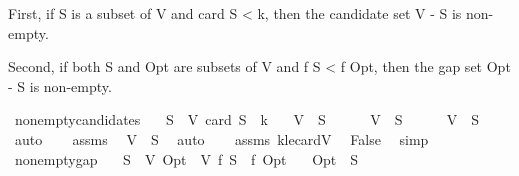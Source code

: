\begin{isabellebody}
\begin{isamarkuptext}
  First, if S is a subset of V and card S < k, then the candidate set V - S
  is non-empty.

  Second, if both S and Opt are subsets of V and f S < f Opt, then the gap
  set Opt - S is non-empty.%
\end{isamarkuptext}\isamarkuptrue%
\isamarkupfalse%
\ nonempty{\isacharunderscore}{\kern0pt}candidates{\isacharcolon}{\kern0pt}\isanewline
\ \ \ {\isachardoublequoteopen}S\ {\isasymsubseteq}\ V{\isachardoublequoteclose}\ {\isachardoublequoteopen}card\ S\ {\isacharless}{\kern0pt}\ k{\isachardoublequoteclose}\isanewline
\ \ \ {\isachardoublequoteopen}V\ {\isacharminus}{\kern0pt}\ S\ {\isasymnoteq}\ {\isacharbraceleft}{\kern0pt}{\isacharbraceright}{\kern0pt}{\isachardoublequoteclose}\isanewline
%
\isadelimproof
%
\endisadelimproof
%
\isatagproof
{}\isamarkupfalse%
\isanewline
\ \ \isamarkupfalse%
\ {\isachardoublequoteopen}V\ {\isacharminus}{\kern0pt}\ S\ {\isacharequal}{\kern0pt}\ {\isacharbraceleft}{\kern0pt}{\isacharbraceright}{\kern0pt}{\isachardoublequoteclose}\isanewline
\ \ \isamarkupfalse%
\ {\isachardoublequoteopen}V\ {\isasymsubseteq}\ S{\isachardoublequoteclose}\ \isamarkupfalse%
\ auto\isanewline
\ \ \isamarkupfalse%
\ assms{\isacharparenleft}{\kern0pt}{}{\isacharparenright}{\kern0pt}\ \isamarkupfalse%
\ {\isachardoublequoteopen}V\ {\isacharequal}{\kern0pt}\ S{\isachardoublequoteclose}\ \isamarkupfalse%
\ auto\isanewline
\ \ \isamarkupfalse%
\ assms{\isacharparenleft}{\kern0pt}{}{\isacharparenright}{\kern0pt}\ k{\isacharunderscore}{\kern0pt}le{\isacharunderscore}{\kern0pt}cardV\ \isamarkupfalse%
\ False\ \isamarkupfalse%
\ simp\isanewline
{}\isamarkupfalse%
%
\endisatagproof
{\isafoldproof}%
%
\isadelimproof
\isanewline
%
\endisadelimproof
\isanewline
{}\isamarkupfalse%
\ nonempty{\isacharunderscore}{\kern0pt}gap{\isacharcolon}{\kern0pt}\isanewline
\ \ \ {\isachardoublequoteopen}S\ {\isasymsubseteq}\ V{\isachardoublequoteclose}\ {\isachardoublequoteopen}Opt\ {\isasymsubseteq}\ V{\isachardoublequoteclose}\ {\isachardoublequoteopen}f\ S\ {\isacharless}{\kern0pt}\ f\ Opt{\isachardoublequoteclose}\isanewline
\ \ \ {\isachardoublequoteopen}Opt\ {\isacharminus}{\kern0pt}\ S\ {\isasymnoteq}\ {\isacharbraceleft}{\kern0pt}{\isacharbraceright}{\kern0pt}{\isachardoublequoteclose}\isanewline

\end{isabellebody}
